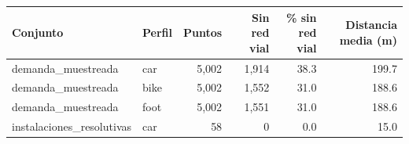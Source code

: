 \begin{tabular}{llrrrr}
\toprule
Conjunto & Perfil & Puntos & Sin red vial & \% sin red vial & Distancia media (m) \\
\midrule
demanda\_muestreada & car & 5,002 & 1,914 & 38.3 & 199.7 \\
demanda\_muestreada & bike & 5,002 & 1,552 & 31.0 & 188.6 \\
demanda\_muestreada & foot & 5,002 & 1,551 & 31.0 & 188.6 \\
instalaciones\_resolutivas & car & 58 & 0 & 0.0 & 15.0 \\
\bottomrule
\end{tabular}
